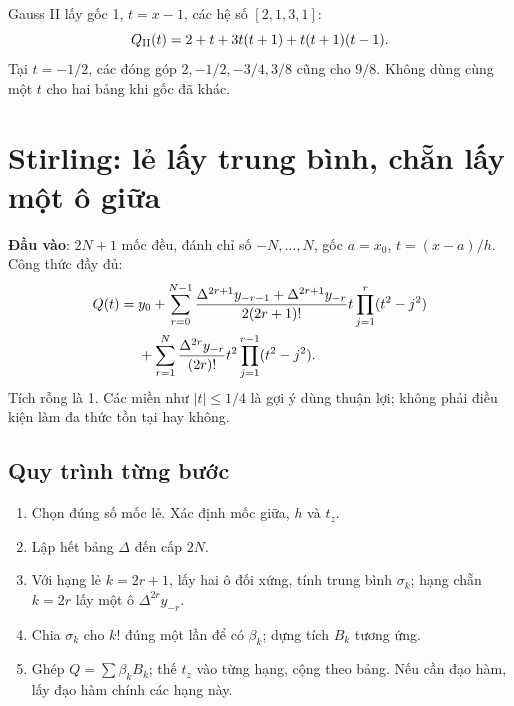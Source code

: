 Gauss II lấy gốc 1, $t=x-1$, các hệ số $[2,1,3,1]$:
\[
 Q_{\rm II}(t)=2+t+3t(t+1)+t(t+1)(t-1).
\]
Tại $t=-1/2$, các đóng góp $2,-1/2,-3/4,3/8$ cũng cho $9/8$. Không dùng cùng một $t$ cho hai bảng khi gốc đã khác.

\section{Stirling: lẻ lấy trung bình, chẵn lấy một ô giữa}
\label{sec:stirling}
\textbf{Đầu vào}: $2N+1$ mốc đều, đánh chỉ số $-N,\ldots,N$, gốc $a=x_0$, $t=(x-a)/h$. Công thức đầy đủ:
\begin{align}
 Q(t)={}&y_0+\sum_{r=0}^{N-1}
 \frac{\Delta^{2r+1}y_{-r-1}+\Delta^{2r+1}y_{-r}}{2(2r+1)!}
 t\prod_{j=1}^r(t^2-j^2)\notag\\
 &+\sum_{r=1}^{N}\frac{\Delta^{2r}y_{-r}}{(2r)!}
 t^2\prod_{j=1}^{r-1}(t^2-j^2).
\end{align}
Tích rỗng là 1. Các miền như $|t|\le1/4$ là gợi ý dùng thuận lợi; không phải điều kiện làm đa thức tồn tại hay không.

\subsection{Quy trình từng bước}
\begin{enumerate}
\item Chọn đúng số mốc lẻ. Xác định mốc giữa, $h$ và $t_z$.
\item Lập hết bảng $\Delta$ đến cấp $2N$.
\item Với hạng lẻ $k=2r+1$, lấy hai ô đối xứng, tính trung bình $\sigma_k$; hạng chẵn $k=2r$ lấy một ô $\Delta^{2r}y_{-r}$.
\item Chia $\sigma_k$ cho $k!$ đúng một lần để có $\beta_k$; dựng tích $B_k$ tương ứng.
\item Ghép $Q=\sum\beta_kB_k$; thế $t_z$ vào từng hạng, cộng theo bảng. Nếu cần đạo hàm, lấy đạo hàm chính các hạng này.
\end{enumerate}

